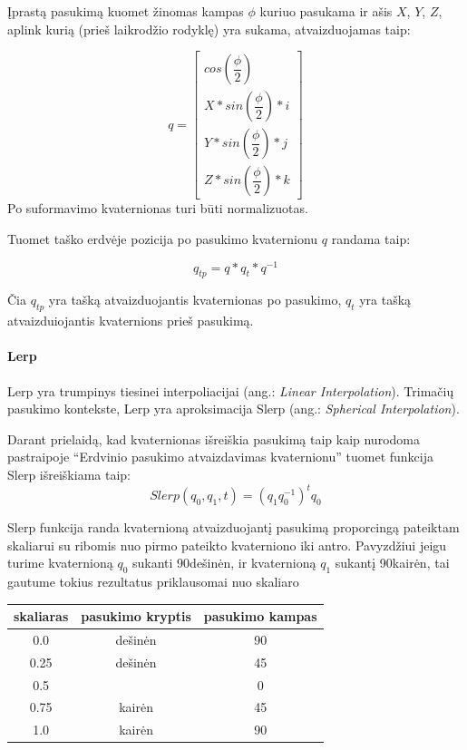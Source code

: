 \documentclass[12pt, a4paper, lithuanian, final]{article}
\begin{document}
Įprastą pasukimą kuomet žinomas kampas $\phi$ kuriuo pasukama ir ašis $X$, $Y$, $Z$, aplink kurią (prieš laikrodžio rodyklę) yra sukama, atvaizduojamas taip:

\begin{equation}
	q = \left[
		\begin{array}{c}
			cos(\dfrac{\phi}{2})\\
			X * sin(\dfrac{\phi}{2}) * i\\
			Y * sin(\dfrac{\phi}{2}) * j \\
			Z * sin(\dfrac{\phi}{2}) * k
		\end{array}
	\right]
\end{equation}
Po suformavimo kvaternionas turi būti normalizuotas.

Tuomet taško erdvėje pozicija po pasukimo kvaternionu $q$ randama taip:

\begin{equation}
	q_{tp} = q * q_{t} * q^{-1}
\end{equation}

Čia $q_{tp}$ yra tašką atvaizduojantis kvaternionas po pasukimo, $q_{t}$ yra tašką atvaizduiojantis kvaternions prieš pasukimą.



\paragraph{Lerp}

Lerp yra trumpinys tiesinei interpoliacijai (ang.: \textit{Linear Interpolation}).
Trimačių pasukimo kontekste, Lerp yra aproksimacija Slerp (ang.: \textit{Spherical Interpolation}).

Darant prielaidą, kad kvaternionas išreiškia pasukimą taip kaip nurodoma pastraipoje "`Erdvinio pasukimo atvaizdavimas kvaternionu"' tuomet funkcija Slerp išreiškiama taip:
\begin{equation}
	Slerp(q_0, q_1, t) = (q_1 q_0^{-1})^{t}q_0
\end{equation}

Slerp funkcija randa kvaternioną atvaizduojantį pasukimą proporcingą pateiktam skaliarui su ribomis nuo pirmo pateikto kvaterniono iki antro.
Pavyzdžiui jeigu turime kvaternioną $q_0$ sukanti 90\degree dešinėn, ir kvaternioną $q_1$ sukantį 90\degree kairėn, tai gautume tokius rezultatus priklausomai nuo skaliaro

\begin{center}
\begin{tabular}{ | c | c | c | }
	\hline
	\textbf{skaliaras} & \textbf{pasukimo kryptis} & \textbf{pasukimo kampas} \\
	\hline
	0.0 & dešinėn & 90\degree \\
	\hline
	0.25 & dešinėn & 45\degree \\
	\hline
	0.5 & & 0\degree \\
	\hline
	0.75 & kairėn & 45\degree \\
	\hline
	1.0 & kairėn & 90\degree \\
	\hline
\end{tabular}
\end{center}
\end{document}
